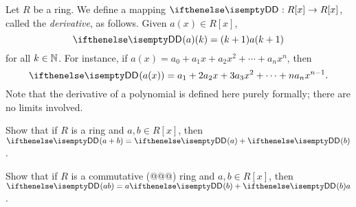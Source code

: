 \begin{dfn}[Derivative]
Let \(R\) be a ring.
We define a mapping \(\DERIV : R[x] \rightarrow R[x]\), called the \emph{derivative}, as follows.
Given \(a(x) \in R[x]\), \[ \DERIV(a)(k) = (k+1)a(k+1) \] for all \(k \in \mathbb{N}\).
For instance, if \(a(x) = a_0 + a_1x + a_2x^2 + \cdots + a_nx^n\), then \[ \DERIV(a(x)) = a_1 + 2a_2x + 3a_3x^2 + \cdots + na_nx^{n-1}. \] Note that the derivative of a polynomial is defined here purely formally; there are no limits involved.
\end{dfn}

\begin{exercise}
Show that if \(R\) is a ring and \(a,b \in R[x]\), then \(\DERIV(a + b) = \DERIV(a) + \DERIV(b)\).
\end{exercise}

\begin{exercise}
Show that if \(R\) is a commutative (@@@) ring and \(a,b \in R[x]\), then \(\DERIV(ab) = a\DERIV(b) + \DERIV(b)a\).
\end{exercise}
